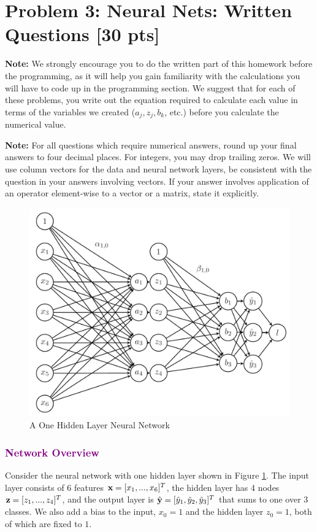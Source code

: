 \section*{Problem 3: Neural Nets: Written Questions [30 pts]}
\label{sec:written}

\textbf{Note:} We strongly encourage you to do the written part of this homework before the programming, as it will help you gain familiarity with the calculations you will have to code up in the programming section. We suggest that for each of these problems, you write out the equation required to calculate each value in terms of the variables we created ($a_j, z_j, b_k$, etc.) before you calculate the numerical value.

\textbf{Note:} For all questions which require numerical answers, round up your final answers to four decimal places. For integers, you may drop trailing zeros. We will use column vectors for the data and neural network layers, be consistent with the question in your answers involving vectors. If your answer involves application of an operator element-wise to a vector or a matrix, state it explicitly.

 \begin{figure}[h]
        \centering
        \includegraphics[height=9cm]{img/network.png}
        \caption{A One Hidden Layer Neural Network}
        \label{fig:oneHL}
    \end{figure}

\subsubsection*{\textcolor{purple}{Network Overview}}
Consider the neural network with one hidden layer shown in Figure \ref{fig:oneHL}. The input layer consists of 6 features $\mathbf{x} = [x_1,...,x_6]^T$, the hidden layer has 4  nodes $\mathbf{z} = [z_1,...,z_4]^T$, and the output layer is $\hat{\mathbf{y}} = [\hat{y}_1, \hat{y}_2, \hat{y}_3]^T$ that sums to one over 3 classes. We also add a bias to the input, $x_0 = 1$ and the hidden layer $z_0 = 1$, both of which are fixed to $1$.


